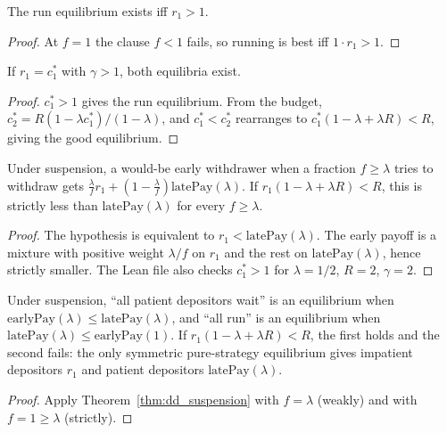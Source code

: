 \begin{theorem}
\label{thm:dd_run_iff}
\leanok
{}
The run equilibrium exists iff $r_1 > 1$.
\end{theorem}
\begin{proof}
\leanok
At $f = 1$ the clause $f < 1$ fails, so running is best iff $1 \cdot r_1 > 1$.
\end{proof}

\begin{theorem}
\label{thm:dd_multiple}
\leanok
{}
If $r_1 = c_1^*$ with $\gamma > 1$, both equilibria exist.
\end{theorem}
\begin{proof}
\leanok
$c_1^* > 1$ gives the run equilibrium. From the budget, $c_2^* = R(1 - \lambda c_1^*)/(1 - \lambda)$, and $c_1^* < c_2^*$
rearranges to $c_1^*(1 - \lambda + \lambda R) < R$, giving the good equilibrium.
\end{proof}

\begin{theorem}
\label{thm:dd_suspension}
\leanok
{}
Under suspension, a would-be early withdrawer when a fraction $f \ge \lambda$ tries to withdraw gets
$\frac{\lambda}{f} r_1 + (1 - \frac{\lambda}{f})\mathrm{latePay}(\lambda)$. If $r_1(1 - \lambda + \lambda R) < R$, this is
strictly less than $\mathrm{latePay}(\lambda)$ for every $f \ge \lambda$.
\end{theorem}
\begin{proof}
\leanok
The hypothesis is equivalent to $r_1 < \mathrm{latePay}(\lambda)$. The early payoff is a mixture with positive weight
$\lambda/f$ on $r_1$ and the rest on $\mathrm{latePay}(\lambda)$, hence strictly smaller. The Lean file also checks
$c_1^* > 1$ for $\lambda = 1/2$, $R = 2$, $\gamma = 2$.
\end{proof}

\begin{theorem}
\label{thm:dd_suspension_unique}
\leanok
{}
Under suspension, ``all patient depositors wait'' is an equilibrium when
$\mathrm{earlyPay}(\lambda) \le \mathrm{latePay}(\lambda)$, and ``all run'' is an equilibrium when
$\mathrm{latePay}(\lambda) \le \mathrm{earlyPay}(1)$. If $r_1(1 - \lambda + \lambda R) < R$, the first holds and the
second fails: the only symmetric pure-strategy equilibrium gives impatient depositors $r_1$ and patient depositors
$\mathrm{latePay}(\lambda)$.
\end{theorem}
\begin{proof}
\leanok
Apply Theorem~\ref{thm:dd_suspension} with $f = \lambda$ (weakly) and with $f = 1 \ge \lambda$ (strictly).
\end{proof}
